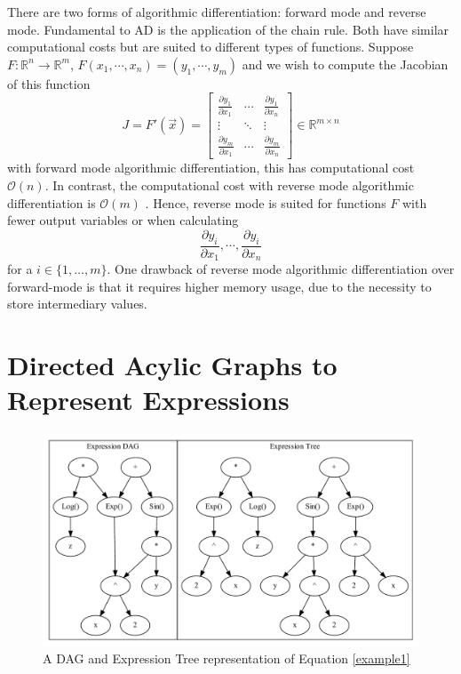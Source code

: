 \documentclass{article}
\begin{document}
There are two forms of algorithmic differentiation: forward mode and reverse mode. Fundamental to AD is the application of the chain rule. Both have similar computational costs but are suited to different types of functions. Suppose $F: \mathbb{R}^n \rightarrow \mathbb{R}^m$, $F(x_1, \cdots, x_n) = (y_1, \cdots, y_m)$ and we wish to compute the Jacobian of this function
\begin{equation*}
    J = F'(\Vec{x}) = \begin{bmatrix}
        \frac{\partial y_1}{\partial x_1} & \cdots & \frac{\partial y_1}{\partial x_n} \\
        \vdots & \ddots & \vdots \\
        \frac{\partial y_m}{\partial x_1} & \cdots & \frac{\partial y_m}{\partial x_n}
    \end{bmatrix} \in \mathbb{R}^{m \times n}
\end{equation*}
with forward mode algorithmic differentiation, this has computational cost $\mathcal{O}(n)$. In contrast, the computational cost with reverse mode algorithmic differentiation is $\mathcal{O}(m)$ \cite{falisse}. Hence, reverse mode is suited for functions $F$ with fewer output variables or when calculating 
\begin{equation*}
    \frac{\partial y_i}{\partial x_1}, \cdots, \frac{\partial y_i}{\partial x_n}
\end{equation*}
for a $i \in \{1, \dots, m \}$.
One drawback of reverse mode algorithmic differentiation over forward-mode is that it requires higher memory usage, due to the necessity to store intermediary values.

\section{Directed Acylic Graphs to Represent Expressions}

\begin{figure}[h]
    \centering
    \includegraphics[width=12cm]{images/Clustergraph.gv.pdf}
    \caption{A DAG and Expression Tree representation of Equation \ref{example1}}
    \label{fig:DAGgraph2}
\end{figure}
\end{document}
